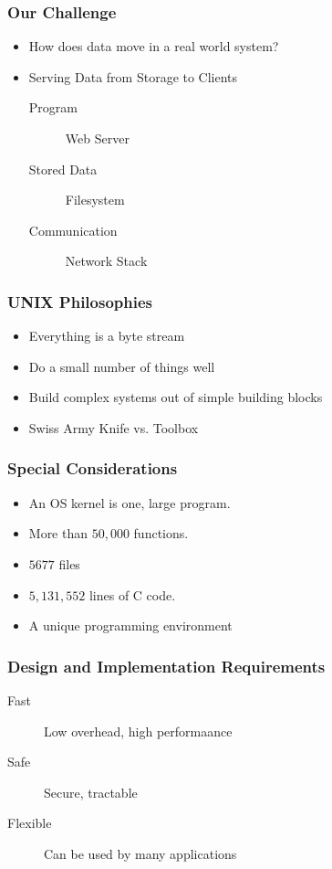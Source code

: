 \documentclass[pdftex]{beamer} %
\begin{document}
\begin{frame}
  \frametitle{Our Challenge}
  \begin{itemize}
  \item How does data move in a real world system?
  \item Serving Data from Storage to Clients
    \begin{description}
    \item[Program] Web Server
    \item[Stored Data] Filesystem
    \item[Communication] Network Stack
    \end{description}
  \end{itemize}
\end{frame}

\begin{frame}
  \frametitle{UNIX Philosophies}
  \begin{itemize}
  \item Everything is a byte stream
  \item Do a small number of things well
  \item Build complex systems out of simple building blocks
  \item Swiss Army Knife vs. Toolbox
  \end{itemize}
\end{frame}

\begin{frame}
  \frametitle{Special Considerations}
  \begin{itemize}
  \item An OS kernel is one, large program.
  \item More than $50,000$ functions.
  \item $5677$ files    
  \item $5,131,552$ lines of C code.
  \item A unique programming environment
  \end{itemize}
\end{frame}

\begin{frame}
  \frametitle{Design and Implementation Requirements}
  \begin{description}
  \item[Fast] Low overhead, high performaance
  \item[Safe] Secure, tractable
  \item[Flexible] Can be used by many applications
  \end{description}
\end{frame}
\end{document}
